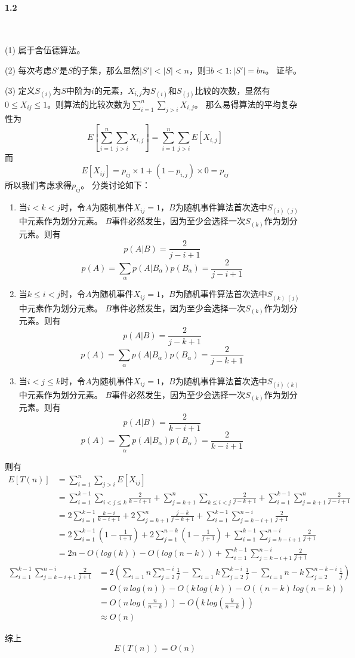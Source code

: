 \paragraph{1.2}~{}

(1)
属于舍伍德算法。

(2)
每次考虑$S'$是$S$的子集，那么显然$|S'|<|S|<n$，则$\exists b<1:|S'|=bn$。
证毕。

(3)
定义$S_{(i)}$为$S$中阶为$i$的元素，$X_{i,j}$为$S_{(i)}$和$S_{(j)}$比较的次数，显然有$0 \le X_{ij} \le 1$。则算法的比较次数为$\sum_{i=1}^{n} \sum_{j>i} X_{i,j}$。
那么易得算法的平均复杂性为$$E[\sum_{i=1}^{n} \sum_{j>i} X_{i,j}]=\sum_{i=1}^{n} \sum_{j>i} E[X_{i,j}]$$
而$$E[X_{ij}]=p_{ij}\times 1+(1-p_{i,j}) \times 0=p_{ij}$$
所以我们考虑求得$p_{ij}$。
分类讨论如下：
\begin{enumerate}[1)]
\item 当$i<k<j$时，令$A$为随机事件$X_{ij}=1$，$B$为随机事件算法首次选中$S_{(i)~(j)}$中元素作为划分元素。
$B$事件必然发生，因为至少会选择一次$S_{(k)}$作为划分元素。则有
$$p(A|B)=\frac{2}{j-i+1}$$
$$p(A)=\sum_{\alpha}p(A|B_{\alpha})p(B_{\alpha})=\frac{2}{j-i+1}$$
\item 当$k \le i<j$时，令$A$为随机事件$X_{ij}=1$，$B$为随机事件算法首次选中$S_{(k)~(j)}$中元素作为划分元素。
$B$事件必然发生，因为至少会选择一次$S_{(k)}$作为划分元素。则有
$$p(A|B)=\frac{2}{j-k+1}$$
$$p(A)=\sum_{\alpha}p(A|B_{\alpha})p(B_{\alpha})=\frac{2}{j-k+1}$$
\item 当$i<j\le k$时，令$A$为随机事件$X_{ij}=1$，$B$为随机事件算法首次选中$S_{(i)~(k)}$中元素作为划分元素。
$B$事件必然发生，因为至少会选择一次$S_{(k)}$作为划分元素。则有
$$p(A|B)=\frac{2}{k-i+1}$$
$$p(A)=\sum_{\alpha}p(A|B_{\alpha})p(B_{\alpha})=\frac{2}{k-i+1}$$
\end{enumerate}
则有
\begin{align}  
    E[T(n)] &= \sum_{i=1}^{n}\sum_{j>i}E[X_{ij}] \nonumber\\
    &= \sum_{i=1}^{k-1}\sum_{i<j\le k}\frac{2}{k-i+1} +\sum_{j=k+1}^{n}\sum_{k\le i<j}\frac{2}{j-k+1}+\sum_{i=1}^{k-1}\sum_{j=k+1}^{n}\frac{2}{j-i+1} \nonumber\\
    &= 2\sum_{i=1}^{k-1}\frac{k-i}{k-i+1} + 2\sum_{j=k+1}^{n} \frac{j-k}{j-k+1} +\sum_{i=1}^{k-1}\sum_{j=k-i+1}^{n-i} \frac{2}{j+1} \nonumber\\
    &= 2\sum_{i=1}^{k-1} (1-\frac{1}{i+1}) + 2\sum_{j=1}^{n-k} (1-\frac{1}{j+1}) +\sum_{i=1}^{k-1}\sum_{j=k-i+1}^{n-i}\frac{2}{j+1} \nonumber\\
    &= 2n-O(log(k))-O(log(n-k)) + \sum_{i=1}^{k-1}\sum_{j=k-i+1}^{n-i} \frac{2}{j+1} \nonumber
\end{align}  
\begin{align}
    \sum_{i=1}^{k-1}\sum_{j=k-i+1}^{n-i} \frac{2}{j+1} &= 2(\sum_{i=1}{n}\sum_{j=2}^{n-i} \frac{1}{j} - \sum_{i=1}{k} \sum_{j=2}^{k-i} \frac{1}{j} - \sum_{i=1}{n-k} \sum_{j=2}^{n-k-i}\frac{1}{j}) \nonumber\\
    &= O(n\, log(n))-O(k\, log(k))-O((n-k)\, log(n-k)) \nonumber\\
    &= O(n\, log(\frac{n}{n-k}))-O(k\, log(\frac{k}{n-k})) \nonumber\\
    &\approx O(n) \nonumber
\end{align}

综上 $$E(T(n)) = O(n)$$